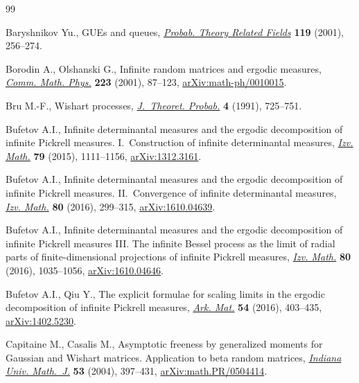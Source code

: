 \documentclass[pdftex]{sigma}
\numberwithin{equation}{section}
\begin{document}
\begin{thebibliography}{99}
\footnotesize\itemsep=0pt

Baryshnikov Yu., G{UE}s and queues, \href{https://doi.org/10.1007/PL00008760}{\textit{Probab. Theory Related Fields}}
 \textbf{119} (2001), 256--274.

Borodin A., Olshanski G., Infinite random matrices and ergodic measures,
 \href{https://doi.org/10.1007/s002200100529}{\textit{Comm. Math. Phys.}} \textbf{223} (2001), 87--123,
 \href{https://arxiv.org/abs/math-ph/0010015}{arXiv:math-ph/0010015}.

Bru M.-F., Wishart processes, \href{https://doi.org/10.1007/BF01259552}{\textit{J.~Theoret. Probab.}} \textbf{4} (1991),
 725--751.

Bufetov A.I., Infinite determinantal measures and the ergodic decomposition of
 infinite Pickrell measures. {I}.~{C}onstruction of infinite determinantal
 measures, \href{https://doi.org/10.1070/IM2015v079n06ABEH002775}{\textit{Izv. Math.}} \textbf{79} (2015), 1111--1156,
 \href{https://arxiv.org/abs/1312.3161}{arXiv:1312.3161}.

Bufetov A.I., Infinite determinantal measures and the ergodic decomposition of
 infinite {P}ickrell measures. {II}.~{C}onvergence of infinite determinantal
 measures, \href{https://doi.org/10.1070/IM8384}{\textit{Izv. Math.}} \textbf{80} (2016), 299--315,
 \href{https://arxiv.org/abs/1610.04639}{arXiv:1610.04639}.

Bufetov A.I., Infinite determinantal measures and the ergodic decomposition of
 infinite {P}ickrell measures {III}. {T}he infinite {B}essel process as the
 limit of radial parts of finite-dimensional projections of infinite
 {P}ickrell measures, \href{https://doi.org/10.1070/IM8385}{\textit{Izv. Math.}} \textbf{80} (2016), 1035--1056,
 \href{https://arxiv.org/abs/1610.04646}{arXiv:1610.04646}.

Bufetov A.I., Qiu Y., The explicit formulae for scaling limits in the ergodic
 decomposition of infinite {P}ickrell measures, \href{https://doi.org/10.1007/s11512-016-0230-x}{\textit{Ark. Mat.}} \textbf{54}
 (2016), 403--435, \href{https://arxiv.org/abs/1402.5230}{arXiv:1402.5230}.

Capitaine M., Casalis M., Asymptotic freeness by generalized moments for
 {G}aussian and {W}ishart matrices. {A}pplication to beta random matrices,
 \href{https://doi.org/10.1512/iumj.2004.53.2325}{\textit{Indiana Univ. Math.~J.}} \textbf{53} (2004), 397--431,
 \href{https://arxiv.org/abs/math.PR/0504414}{arXiv:math.PR/0504414}.


\end{thebibliography}
\end{document}

